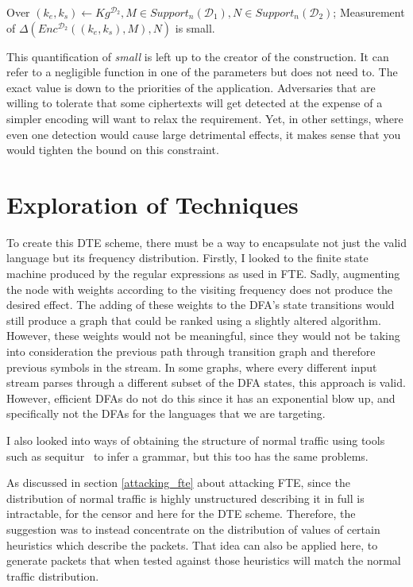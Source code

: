 \documentclass[ %
                    author={Samuel Russell},
                supervisor={Prof. Bogdan Warinschi},
                    degree={MEng},
                     title={Innocuous Ciphertexts},
                  subtitle={The DE-CENSOR Scheme},
                      type={Research},
                      year={2018} ]{dissertation}
\begin{document}
Over $ (k_e,k_s) \leftarrow Kg^{\mathcal{D}_2}, M \in Support_n(\mathcal{D}_1), N \in Support_n(\mathcal{D}_2)$; Measurement of $\Delta \left(  Enc^{\mathcal{D}_2}((k_e,k_s), M), N  \right)$ is small.

This quantification of \textit{small} is left up to the creator of the construction.
It can refer to a negligible function in one of the parameters but does not need to.
The exact value is down to the priorities of the application.
Adversaries that are willing to tolerate that some ciphertexts will get detected at the expense of a simpler encoding will want to relax the requirement.
Yet, in other settings, where even one detection would cause large detrimental effects, it makes sense that you would tighten the bound on this constraint.


\section{Exploration of Techniques}\label{exploration_of_techniques}

To create this DTE scheme, there must be a way to encapsulate not just the valid language but its frequency distribution.
Firstly, I looked to the finite state machine produced by the regular expressions as used in FTE. Sadly, augmenting the node with weights according to the visiting frequency does not produce the desired effect.
The adding of these weights to the DFA's state transitions would still produce a graph that could be ranked using a slightly altered algorithm.
However, these weights would not be meaningful, since they would not be taking into consideration the previous path through transition graph and therefore previous symbols in the stream.
In some graphs, where every different input stream parses through a different subset of the DFA states, this approach is valid.
However, efficient DFAs do not do this since it has an exponential blow up, and specifically not the DFAs for the languages that we are targeting.

I also looked into ways of obtaining the structure of normal traffic using tools such as sequitur~\cite{sequitur} to infer a grammar, but this too has the same problems.

As discussed in section \ref{attacking_fte} about attacking FTE, since the distribution of normal traffic is highly unstructured describing it in full is intractable, for the censor and here for the DTE scheme.
Therefore, the suggestion was to instead concentrate on the distribution of values of certain heuristics which describe the packets.
That idea can also be applied here, to generate packets that when tested against those heuristics will match the normal traffic distribution.
\end{document}

